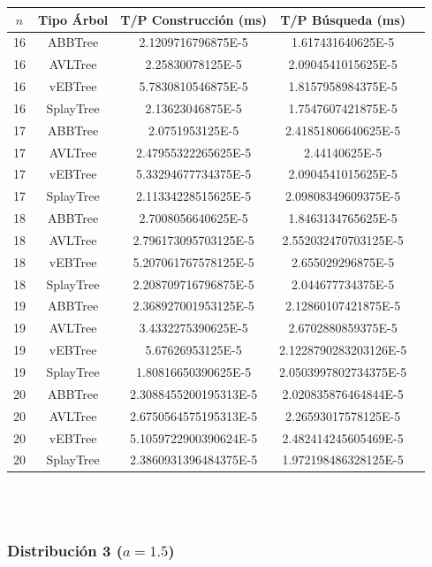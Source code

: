 \documentclass[letterpaper,12pt]{article}
\begin{document}
\begin{tabular}{|c|c|c|c|c|}
\hline
\textbf{$n$} & \textbf{Tipo Árbol} & \textbf{T/P Construcción (ms)} & \textbf{T/P Búsqueda (ms)} \\
\hline
16 & ABBTree & 2.1209716796875E-5 & 1.617431640625E-5 \\
\hline
16 & AVLTree & 2.25830078125E-5  & 2.0904541015625E-5 \\
\hline
16 & vEBTree & 5.7830810546875E-5  & 1.8157958984375E-5 \\
\hline
16 & SplayTree & 2.13623046875E-5 & 1.7547607421875E-5 \\
\hline
\hline
17 & ABBTree & 2.0751953125E-5  & 2.41851806640625E-5 \\
\hline
17 & AVLTree & 2.47955322265625E-5 & 2.44140625E-5 \\
\hline
17 & vEBTree & 5.33294677734375E-5  & 2.0904541015625E-5\\
\hline
17 & SplayTree & 2.11334228515625E-5 & 2.09808349609375E-5 \\
\hline
\hline
18 & ABBTree & 2.7008056640625E-5 & 1.8463134765625E-5 \\
\hline
18 & AVLTree & 2.796173095703125E-5 & 2.552032470703125E-5 \\
\hline
18 & vEBTree & 5.207061767578125E-5 & 2.655029296875E-5 \\
\hline
18 & SplayTree & 2.208709716796875E-5  & 2.044677734375E-5 \\
\hline
\hline
19 & ABBTree & 2.368927001953125E-5 & 2.12860107421875E-5 \\
\hline
19 & AVLTree & 3.4332275390625E-5  & 2.6702880859375E-5 \\
\hline
19 & vEBTree & 5.67626953125E-5 & 2.1228790283203126E-5\\
\hline
19 & SplayTree & 1.80816650390625E-5 & 2.0503997802734375E-5 \\
\hline
\hline
20 & ABBTree & 2.3088455200195313E-5 & 2.020835876464844E-5 \\
\hline
20 & AVLTree & 2.6750564575195313E-5 & 2.26593017578125E-5 \\
\hline
20 & vEBTree & 5.1059722900390624E-5 & 2.482414245605469E-5\\
\hline
20 & SplayTree & 2.3860931396484375E-5 & 1.972198486328125E-5 \\
\hline
\end{tabular}
\\ \\

\subsubsection{Distribución 3 ($a=1.5$)}
\end{document}
